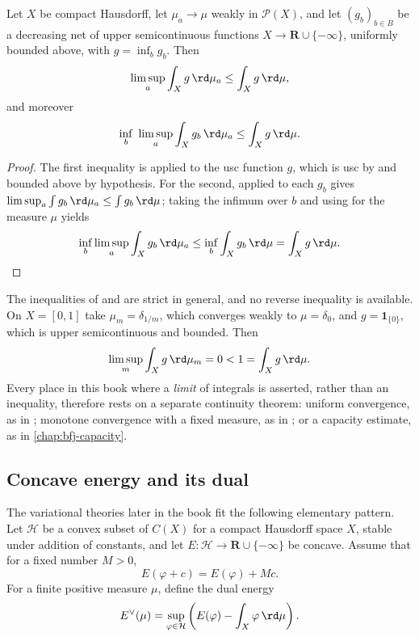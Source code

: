 \begin{lemma}
\label{lem:usc-along-decreasing-net}
Let $X$ be compact Hausdorff, let $\mu_a\to\mu$ weakly in $\mathcal P(X)$, and
let $(g_b)_{b\in B}$ be a decreasing net of upper semicontinuous functions
$X\to\mathbf R\cup\{-\infty\}$, uniformly bounded above, with
$g=\inf_bg_b$.  Then
\[
 \limsup_a\int_Xg\,\rd\mu_a\leq\int_Xg\,\rd\mu ,
\]
and moreover
\[
 \inf_b\ \limsup_a\int_Xg_b\,\rd\mu_a\leq\int_Xg\,\rd\mu .
\]
\end{lemma}

\begin{proof}
The first inequality is  applied to the usc function
$g$, which is usc by  and bounded above by hypothesis.  For
the second,  applied to each $g_b$ gives
$\limsup_a\int g_b\,\rd\mu_a\leq\int g_b\,\rd\mu$; taking the infimum over $b$
and using  for the measure $\mu$ yields
\[
 \inf_b\limsup_a\int_Xg_b\,\rd\mu_a
 \leq\inf_b\int_Xg_b\,\rd\mu=\int_Xg\,\rd\mu .
\]
\end{proof}

\begin{remark}
\label{rem:no-reverse-inequality}
The inequalities of  and
 are strict in general, and no reverse
inequality is available.  On $X=[0,1]$ take $\mu_m=\delta_{1/m}$, which
converges weakly to $\mu=\delta_0$, and $g=\mathbf 1_{\{0\}}$, which is upper
semicontinuous and bounded.  Then
\[
 \limsup_m\int_Xg\,\rd\mu_m=0<1=\int_Xg\,\rd\mu .
\]
Every place in this book where a \emph{limit} of integrals is asserted,
rather than an inequality, therefore rests on a separate continuity theorem:
uniform convergence, as in ; monotone convergence
with a fixed measure, as in ; or a
capacity estimate, as in \cref{chap:bfj-capacity}.
\end{remark}

\subsection{Concave energy and its dual}

The variational theories later in the book fit the following elementary
pattern.  Let $\mathcal H$ be a convex subset of $C(X)$ for a compact
Hausdorff space $X$, stable under addition of constants, and let
$E:\mathcal H\to\mathbf R\cup\{-\infty\}$ be concave.  Assume that for a
fixed number $M>0$,
\begin{equation}
\label{eq:energy-translation}
                         E(\varphi+c)=E(\varphi)+Mc.
\end{equation}
For a finite positive measure $\mu$, define the dual energy
\begin{equation}
\label{eq:dual-energy-abstract}
 E^\vee(\mu)=
 \sup_{\varphi\in\mathcal H}
 \left(E(\varphi)-\int_X\varphi\,\rd \mu\right).
\end{equation}

